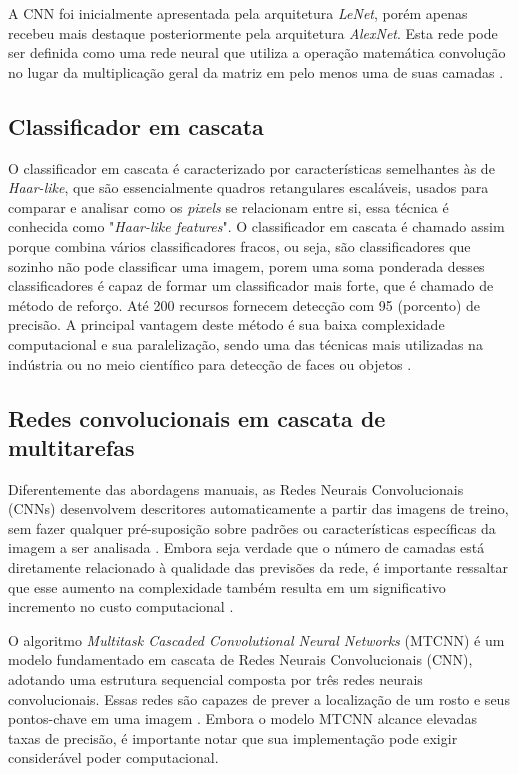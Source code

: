A CNN foi inicialmente apresentada pela arquitetura \textit{LeNet},
porém apenas recebeu mais destaque posteriormente pela arquitetura \textit{AlexNet}. Esta rede
pode ser definida como uma rede neural que utiliza a operação matemática convolução
no lugar da multiplicação geral da matriz em pelo menos uma de suas camadas \cite{lecun1998}.

\subsection{Classificador em cascata}\label{subsec:cascatas}

O classificador em cascata é caracterizado por características semelhantes 
às de \textit{Haar-like}, que são essencialmente quadros retangulares escaláveis, 
usados para comparar e analisar como os \textit{pixels} se relacionam entre si, essa 
técnica é conhecida como "\textit{Haar-like features}". O classificador em 
cascata é chamado assim porque  combina vários classificadores fracos, ou seja, 
são classificadores que sozinho não pode classificar uma imagem, porem uma soma 
ponderada desses classificadores é capaz de formar um classificador mais forte, 
que é chamado de método de reforço. Até 200 recursos fornecem detecção com 
95 (porcento) de precisão. A principal vantagem deste método é sua baixa 
complexidade computacional e sua paralelização, sendo uma das técnicas mais 
utilizadas na indústria ou no meio científico para detecção de faces ou 
objetos \cite{viola2004}.

\subsection{Redes convolucionais em cascata de multitarefas}\label{subsec:multirarefas}

Diferentemente das abordagens manuais, as Redes Neurais Convolucionais 
(CNNs) desenvolvem descritores automaticamente a partir das imagens de 
treino, sem fazer qualquer pré-suposição sobre padrões ou características 
específicas da imagem a ser analisada \cite{zafeiriou2015}. 
Embora seja verdade que o número de camadas está diretamente relacionado 
à qualidade das previsões da rede, é importante ressaltar que esse aumento 
na complexidade também resulta em um significativo incremento no custo 
computacional \cite{mukherjee2015}.

O algoritmo \textit{Multitask Cascaded Convolutional Neural Networks} (MTCNN) 
é um modelo fundamentado em cascata de Redes Neurais Convolucionais (CNN), 
adotando uma estrutura sequencial composta por três redes neurais 
convolucionais. Essas redes são capazes de prever a localização de um 
rosto e seus pontos-chave em uma imagem \cite{zhang2016}. Embora o 
modelo MTCNN alcance elevadas taxas de precisão, é importante notar que 
sua implementação pode exigir considerável poder computacional.

